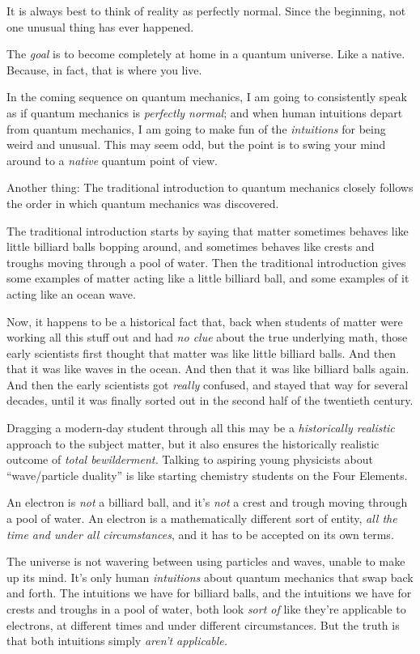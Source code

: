 {
 It is always best to think of reality as perfectly normal. Since
the beginning, not one unusual thing has ever happened.}

{
 The \textit{goal} is to become completely at home in a quantum
universe. Like a native. Because, in fact, that is where you live.}

{
 In the coming sequence on quantum mechanics, I am going to
consistently speak as if quantum mechanics is \textit{perfectly
normal}; and when human intuitions depart from quantum mechanics, I am
going to make fun of the \textit{intuitions} for being weird and
unusual. This may seem odd, but the point is to swing your mind around
to a \textit{native} quantum point of view.}

{
 Another thing: The traditional introduction to quantum mechanics
closely follows the order in which quantum mechanics was discovered.}

{
 The traditional introduction starts by saying that matter
sometimes behaves like little billiard balls bopping around, and
sometimes behaves like crests and troughs moving through a pool of
water. Then the traditional introduction gives some examples of matter
acting like a little billiard ball, and some examples of it acting like
an ocean wave.}

{
 Now, it happens to be a historical fact that, back when students
of matter were working all this stuff out and had \textit{no clue}
about the true underlying math, those early scientists first thought
that matter was like little billiard balls. And then that it was like
waves in the ocean. And then that it was like billiard balls again. And
then the early scientists got \textit{really} confused, and stayed that
way for several decades, until it was finally sorted out in the second
half of the twentieth century.}

{
 Dragging a modern-day student through all this may be a
\textit{historically realistic} approach to the subject matter, but it
also ensures the historically realistic outcome of \textit{total
bewilderment.} Talking to aspiring young physicists about
``wave/particle duality'' is like
starting chemistry students on the Four Elements.}

{
 An electron is \textit{not} a billiard ball, and
it's \textit{not} a crest and trough moving through a
pool of water. An electron is a mathematically different sort of
entity, \textit{all the time and under all circumstances}, and it has
to be accepted on its own terms.}

{
 The universe is not wavering between using particles and waves,
unable to make up its mind. It's only human
\textit{intuitions} about quantum mechanics that swap back and forth.
The intuitions we have for billiard balls, and the intuitions we have
for crests and troughs in a pool of water, both look \textit{sort of}
like they're applicable to electrons, at different
times and under different circumstances. But the truth is that both
intuitions simply \textit{aren't applicable.}}

